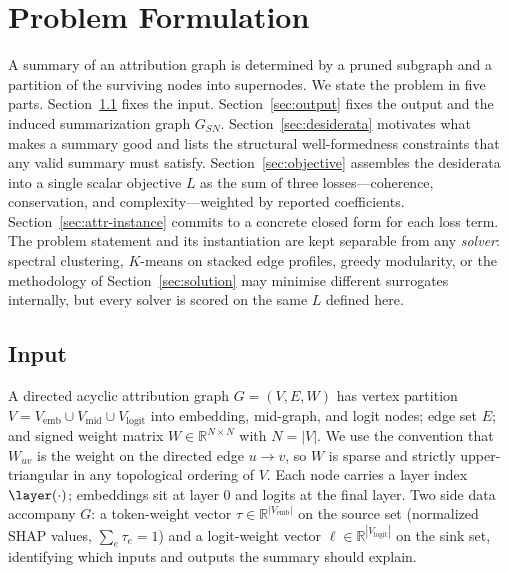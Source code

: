 
\section{Problem Formulation}\label{sec:setup}

A summary of an attribution graph is determined by a pruned subgraph and
a partition of the surviving nodes into supernodes. We state the problem
in five parts. Section~\ref{sec:input} fixes the input.
Section~\ref{sec:output} fixes the output and the induced summarization
graph $G_{SN}$. Section~\ref{sec:desiderata} motivates what makes a
summary good and lists the structural well-formedness constraints that
any valid summary must satisfy. Section~\ref{sec:objective} assembles
the desiderata into a single scalar objective $L$ as the sum of three
losses---coherence, conservation, and complexity---weighted by reported
coefficients. Section~\ref{sec:attr-instance} commits to a concrete
closed form for each loss term. The problem statement and its
instantiation are kept separable from any \emph{solver}: spectral
clustering, $K$-means on stacked edge profiles, greedy modularity, or
the methodology of Section~\ref{sec:solution} may minimise different
surrogates internally, but every solver is scored on the same $L$
defined here.

\subsection{Input}\label{sec:input}

A directed acyclic attribution graph $G = (V, E, W)$ has vertex partition
$V = V_{\text{emb}} \cup V_{\text{mid}} \cup V_{\text{logit}}$ into
embedding, mid-graph, and logit nodes; edge set $E$; and signed weight
matrix $W \in \mathbb{R}^{N \times N}$ with $N = |V|$. We use the
convention that $W_{uv}$ is the weight on the directed edge $u \to v$,
so $W$ is sparse and strictly upper-triangular in any topological
ordering of $V$. Each node carries a layer index $\layer(\cdot)$;
embeddings sit at layer $0$ and logits at the final layer. Two side data
accompany $G$: a token-weight vector $\tau \in \mathbb{R}^{|V_{\text{emb}}|}$
on the source set (normalized SHAP values, $\sum_e \tau_e = 1$) and a
logit-weight vector $\ell \in \mathbb{R}^{|V_{\text{logit}}|}$ on the
sink set, identifying which inputs and outputs the summary should
explain.

